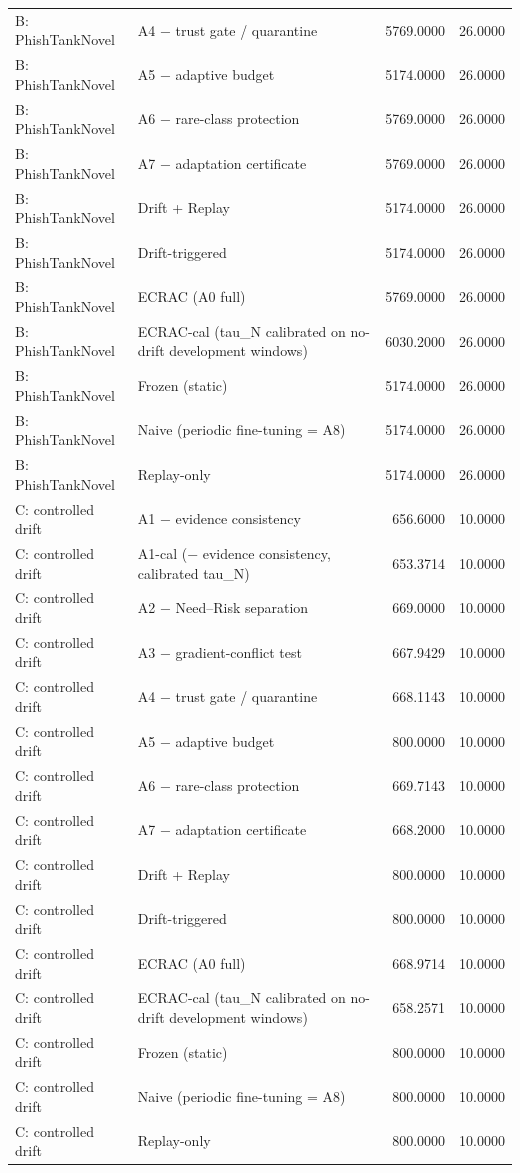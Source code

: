 \begin{table}[t]
\begin{tabular}{llrr}
B: PhishTankNovel & A4 − trust gate / quarantine & 5769.0000 & 26.0000 \\
B: PhishTankNovel & A5 − adaptive budget & 5174.0000 & 26.0000 \\
B: PhishTankNovel & A6 − rare-class protection & 5769.0000 & 26.0000 \\
B: PhishTankNovel & A7 − adaptation certificate & 5769.0000 & 26.0000 \\
B: PhishTankNovel & Drift + Replay & 5174.0000 & 26.0000 \\
B: PhishTankNovel & Drift-triggered & 5174.0000 & 26.0000 \\
B: PhishTankNovel & ECRAC (A0 full) & 5769.0000 & 26.0000 \\
B: PhishTankNovel & ECRAC-cal (tau\_N calibrated on no-drift development windows) & 6030.2000 & 26.0000 \\
B: PhishTankNovel & Frozen (static) & 5174.0000 & 26.0000 \\
B: PhishTankNovel & Naive (periodic fine-tuning = A8) & 5174.0000 & 26.0000 \\
B: PhishTankNovel & Replay-only & 5174.0000 & 26.0000 \\
C: controlled drift & A1 − evidence consistency & 656.6000 & 10.0000 \\
C: controlled drift & A1-cal (− evidence consistency, calibrated tau\_N) & 653.3714 & 10.0000 \\
C: controlled drift & A2 − Need–Risk separation & 669.0000 & 10.0000 \\
C: controlled drift & A3 − gradient-conflict test & 667.9429 & 10.0000 \\
C: controlled drift & A4 − trust gate / quarantine & 668.1143 & 10.0000 \\
C: controlled drift & A5 − adaptive budget & 800.0000 & 10.0000 \\
C: controlled drift & A6 − rare-class protection & 669.7143 & 10.0000 \\
C: controlled drift & A7 − adaptation certificate & 668.2000 & 10.0000 \\
C: controlled drift & Drift + Replay & 800.0000 & 10.0000 \\
C: controlled drift & Drift-triggered & 800.0000 & 10.0000 \\
C: controlled drift & ECRAC (A0 full) & 668.9714 & 10.0000 \\
C: controlled drift & ECRAC-cal (tau\_N calibrated on no-drift development windows) & 658.2571 & 10.0000 \\
C: controlled drift & Frozen (static) & 800.0000 & 10.0000 \\
C: controlled drift & Naive (periodic fine-tuning = A8) & 800.0000 & 10.0000 \\
C: controlled drift & Replay-only & 800.0000 & 10.0000 \\
\bottomrule
\end{tabular}
\end{table}